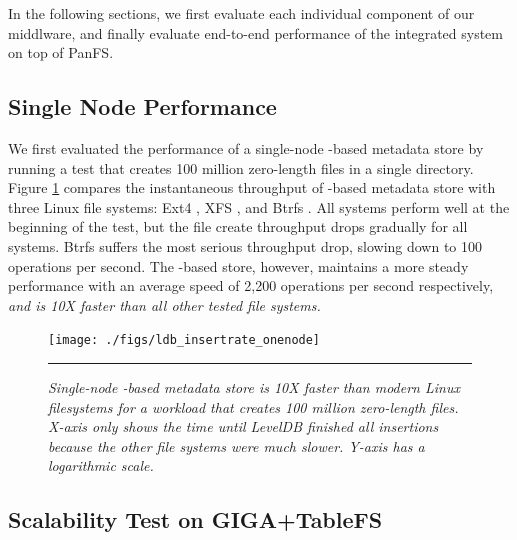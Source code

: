 In the following sections, we first evaluate each individual component
of our middlware, and finally evaluate end-to-end performance of
the integrated system on top of PanFS.

\subsection{Single Node Performance}
We first evaluated the performance of a single-node \ldb-based metadata store
by running a test that creates 100 million zero-length files in a single
directory.
Figure \ref{graph:ldb-singlenode} compares the instantaneous throughput of \ldb-based metadata 
store with three Linux file systems: Ext4 \cite{Ext4}, XFS \cite{XFS}, and
Btrfs \cite{BTRFS}.
All systems perform well at the beginning of the test, but the file create
throughput drops gradually for all systems.
Btrfs suffers the most serious throughput drop, slowing down to 100 operations
per second.
The \ldb-based store, however, maintains a more steady performance
with an average speed of 2,200 operations per second respectively,
\textit{and is 10X faster than all other tested file systems.}

\begin{figure}[t]  %
\centerline{\texttt{[image: ./figs/ldb\_insertrate\_onenode]}}
\vspace{10pt}
\caption{\normalsize
\textit{Single-node \ldb{}-based metadata store is 10X faster than modern Linux
filesystems for a workload that creates 100 million zero-length files.
X-axis only shows the time until LevelDB finished all insertions because the other
file systems were much slower. Y-axis has a logarithmic scale.}
}
\vspace{10pt}
\hrule
\label{graph:ldb-singlenode}
\end{figure}       %

\subsection{Scalability Test on GIGA+TableFS}


